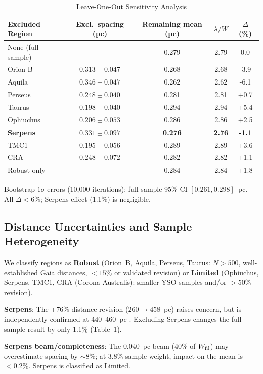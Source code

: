 \documentclass[twoside,twocolumn]{mnras}
\begin{document}
\begin{table}[h]
\caption{Leave-One-Out Sensitivity Analysis}
\label{tab:leave_one_out}
\begin{tabular}{lcccc}
\toprule
Excluded Region & Excl.\ spacing (pc) & Remaining mean (pc) & $\lambda/W$ & $\Delta$ (\%) \\
\midrule
None (full sample) & --- & 0.279 & 2.79 & 0.0 \\
Orion B & $0.313 \pm 0.047$ & 0.268 & 2.68 & -3.9 \\
Aquila & $0.346 \pm 0.047$ & 0.262 & 2.62 & -6.1 \\
Perseus & $0.248 \pm 0.040$ & 0.281 & 2.81 & +0.7 \\
Taurus & $0.198 \pm 0.040$ & 0.294 & 2.94 & +5.4 \\
Ophiuchus & $0.206 \pm 0.053$ & 0.286 & 2.86 & +2.5 \\
\textbf{Serpens} & $0.331 \pm 0.097$ & \textbf{0.276} & \textbf{2.76} & \textbf{-1.1} \\
TMC1 & $0.195 \pm 0.056$ & 0.289 & 2.89 & +3.6 \\
CRA & $0.248 \pm 0.072$ & 0.282 & 2.82 & +1.1 \\
\midrule
Robust only & --- & 0.284 & 2.84 & +1.8 \\
\bottomrule
\end{tabular}
\vspace{2pt}
\footnotesize Bootstrap $1\sigma$ errors (10,000 iterations); full-sample 95\% CI $[0.261, 0.298]$~pc. All $\Delta < 6\%$; Serpens effect (1.1\%) is negligible.
\end{table}

\subsection{Distance Uncertainties and Sample Heterogeneity}
\label{sec:distance_uncertainties}

We classify regions as \textbf{Robust} (Orion~B, Aquila, Perseus, Taurus: $N>500$,
well-established Gaia distances, $<15\%$ or validated revision) or \textbf{Limited}
(Ophiuchus, Serpens, TMC1, CRA (Corona Australis): smaller YSO samples and/or $>50\%$ revision).

\textbf{Serpens}: The +76\% distance revision ($260 \to 458$~pc) raises concern, but is independently confirmed at $440$--$460$~pc \citep{Yan2022, Green2024, Zucker2020}. Excluding Serpens changes the full-sample result by only 1.1\% (Table~\ref{tab:leave_one_out}).

\textbf{Serpens beam/completeness}: The $0.040$~pc beam (40\% of $W_{\rm fil}$) may
overestimate spacing by ${\sim}8\%$; at 3.8\% sample weight, impact on the mean is
$<0.2\%$. Serpens is classified as Limited.
\end{document}
